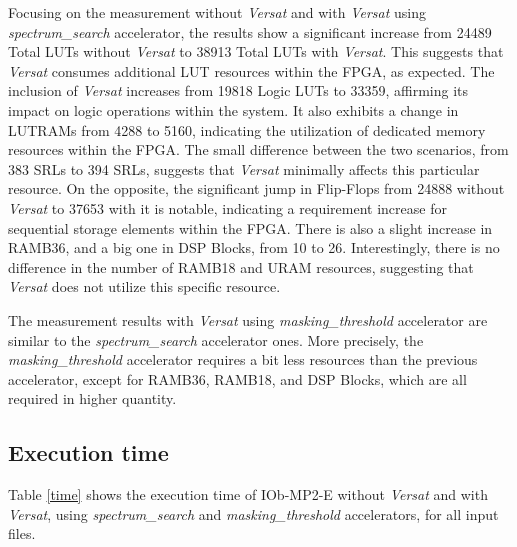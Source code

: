 Focusing on the measurement without \textit{Versat} and with \textit{Versat} using \textit{spectrum\_search} accelerator, the results show a significant increase from 24489 Total LUTs without \textit{Versat} to 38913 Total LUTs with \textit{Versat}. This suggests that \textit{Versat} consumes additional LUT resources within the FPGA, as expected.
The inclusion of \textit{Versat} increases from 19818 Logic LUTs to 33359, affirming its impact on logic operations within the system. It also exhibits a change in LUTRAMs from 4288 to 5160, indicating the utilization of dedicated memory resources within the FPGA.
The small difference between the two scenarios, from 383 SRLs to 394 SRLs, suggests that \textit{Versat} minimally affects this particular resource. On the opposite, the significant jump in Flip-Flops from 24888 without \textit{Versat} to 37653 with it is notable, indicating a requirement increase for sequential storage elements within the FPGA.
There is also a slight increase in RAMB36, and a big one in DSP Blocks, from 10 to 26.
Interestingly, there is no difference in the number of RAMB18 and URAM resources, suggesting that \textit{Versat} does not utilize this specific resource.

The measurement results with \textit{Versat} using \textit{masking\_threshold} accelerator are similar to the \textit{spectrum\_search} accelerator ones. More precisely, the \textit{masking\_threshold} accelerator requires a bit less resources than the previous accelerator, except for RAMB36, RAMB18, and DSP Blocks, which are all required in higher quantity.


\subsection{Execution time}

Table \ref{time} shows the execution time of IOb-MP2-E without \textit{Versat} and with \textit{Versat}, using \textit{spectrum\_search} and \textit{masking\_threshold} accelerators, for all input files.

\vspace{0.5cm}

